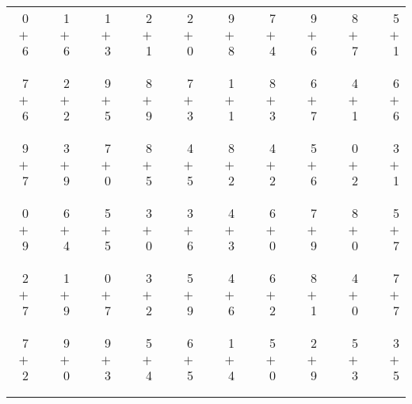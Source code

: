 \documentclass[12pt, letterpaper]{article}
\begin{document}
\begin{tabular}{rrrrrrrrrrrrrrrrrrr}
0 & & 1 & & 1 & & 2 & & 2 & & 9 & & 7 & & 9 & & 8 & & 5\\
$+$ 6 & & $+$ 6 & & $+$ 3 & & $+$ 1 & & $+$ 0 & & $+$ 8 & & $+$ 4 & & $+$ 6 & & $+$ 7 & & $+$ 1\\
\cline{1-1} \cline{3-3} \cline{5-5} \cline{7-7} \cline{9-9} \cline{11-11} \cline{13-13} \cline{15-15} \cline{17-17} \cline{19-19} \\ \\
7 & & 2 & & 9 & & 8 & & 7 & & 1 & & 8 & & 6 & & 4 & & 6\\
$+$ 6 & & $+$ 2 & & $+$ 5 & & $+$ 9 & & $+$ 3 & & $+$ 1 & & $+$ 3 & & $+$ 7 & & $+$ 1 & & $+$ 6\\
\cline{1-1} \cline{3-3} \cline{5-5} \cline{7-7} \cline{9-9} \cline{11-11} \cline{13-13} \cline{15-15} \cline{17-17} \cline{19-19} \\ \\
9 & & 3 & & 7 & & 8 & & 4 & & 8 & & 4 & & 5 & & 0 & & 3\\
$+$ 7 & & $+$ 9 & & $+$ 0 & & $+$ 5 & & $+$ 5 & & $+$ 2 & & $+$ 2 & & $+$ 6 & & $+$ 2 & & $+$ 1\\
\cline{1-1} \cline{3-3} \cline{5-5} \cline{7-7} \cline{9-9} \cline{11-11} \cline{13-13} \cline{15-15} \cline{17-17} \cline{19-19} \\ \\
0 & & 6 & & 5 & & 3 & & 3 & & 4 & & 6 & & 7 & & 8 & & 5\\
$+$ 9 & & $+$ 4 & & $+$ 5 & & $+$ 0 & & $+$ 6 & & $+$ 3 & & $+$ 0 & & $+$ 9 & & $+$ 0 & & $+$ 7\\
\cline{1-1} \cline{3-3} \cline{5-5} \cline{7-7} \cline{9-9} \cline{11-11} \cline{13-13} \cline{15-15} \cline{17-17} \cline{19-19} \\ \\
2 & & 1 & & 0 & & 3 & & 5 & & 4 & & 6 & & 8 & & 4 & & 7\\
$+$ 7 & & $+$ 9 & & $+$ 7 & & $+$ 2 & & $+$ 9 & & $+$ 6 & & $+$ 2 & & $+$ 1 & & $+$ 0 & & $+$ 7\\
\cline{1-1} \cline{3-3} \cline{5-5} \cline{7-7} \cline{9-9} \cline{11-11} \cline{13-13} \cline{15-15} \cline{17-17} \cline{19-19} \\ \\
7 & & 9 & & 9 & & 5 & & 6 & & 1 & & 5 & & 2 & & 5 & & 3\\
$+$ 2 & & $+$ 0 & & $+$ 3 & & $+$ 4 & & $+$ 5 & & $+$ 4 & & $+$ 0 & & $+$ 9 & & $+$ 3 & & $+$ 5\\
\cline{1-1} \cline{3-3} \cline{5-5} \cline{7-7} \cline{9-9} \cline{11-11} \cline{13-13} \cline{15-15} \cline{17-17} \cline{19-19} \\ \\

\end{tabular}
\end{document}
